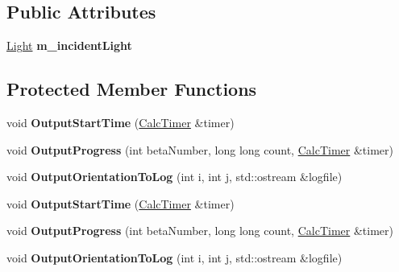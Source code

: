 \subsection*{Public Attributes}
\begin{DoxyCompactItemize}
\item 
\mbox{\label{class_tracer_ae325f44ed4a3f6c84c7800d34cdb09ef}} 
\mbox{\hyperlink{class_light}{Light}} {\bfseries m\+\_\+incident\+Light}
\end{DoxyCompactItemize}
\subsection*{Protected Member Functions}
\begin{DoxyCompactItemize}
\item 
\mbox{\label{class_tracer_a0e63f88ff2b5a510ae8f9894b50b1113}} 
void {\bfseries Output\+Start\+Time} (\mbox{\hyperlink{class_calc_timer}{Calc\+Timer}} \&timer)
\item 
\mbox{\label{class_tracer_ae64f2f145478e965db421f95ecc41de1}} 
void {\bfseries Output\+Progress} (int beta\+Number, long long count, \mbox{\hyperlink{class_calc_timer}{Calc\+Timer}} \&timer)
\item 
\mbox{\label{class_tracer_a83143f902694a20b395fcb5868055640}} 
void {\bfseries Output\+Orientation\+To\+Log} (int i, int j, std\+::ostream \&logfile)
\item 
\mbox{\label{class_tracer_a0e63f88ff2b5a510ae8f9894b50b1113}} 
void {\bfseries Output\+Start\+Time} (\mbox{\hyperlink{class_calc_timer}{Calc\+Timer}} \&timer)
\item 
\mbox{\label{class_tracer_ae64f2f145478e965db421f95ecc41de1}} 
void {\bfseries Output\+Progress} (int beta\+Number, long long count, \mbox{\hyperlink{class_calc_timer}{Calc\+Timer}} \&timer)
\item 
\mbox{\label{class_tracer_a83143f902694a20b395fcb5868055640}} 
void {\bfseries Output\+Orientation\+To\+Log} (int i, int j, std\+::ostream \&logfile)
\end{DoxyCompactItemize}
